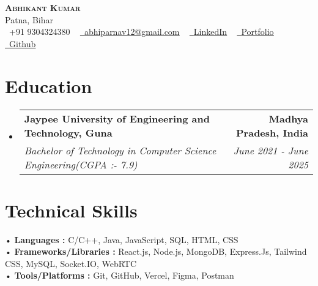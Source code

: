 \documentclass[letterpaper,11pt]{article}
\makeatletter
\newcommand{\resumeSubheading}[4]{
  \vspace{-2pt}\item
	\begin{tabular*}{1.0\textwidth}[t]{l@{\extracolsep{\fill}}r}
  	\textbf{#1} & \textbf{\small #2} \\
  	\textit{\small#3} & \textit{\small #4} \\
	\end{tabular*}\vspace{-7pt}
}
\newcommand{\resumeSubHeadingListStart}{\begin{itemize}[leftmargin=0.0in, label={}]}
\newcommand{\resumeSubHeadingListEnd}{\end{itemize}}
\makeatother
\begin{document}
 

\begin{center}
	{\Huge  {\scshape \textbf{Abhikant Kumar}}} \\ \vspace{3pt}
	Patna, Bihar  \\ \vspace{3pt}
	\small \raisebox{-0.1\height}\faPhone\ +91 9304324380 ~ \href{mailto:x@gmail.com}{\raisebox{-0.2\height}\faEnvelope\  \underline{abhiparnav12@gmail.com}} ~
	\href{https://linkedin.com/in//}{\raisebox{-0.2\height}\faLinkedin\ \underline{LinkedIn}} ~
   \href{https://abhikant-portfolio.netlify.app/}{\raisebox{-0.2\height}\faGlobe\ \underline{Portfolio}} ~ \href{https://github.com/abhikant12}{\raisebox{-0.2\height}\faGithub\ \underline{Github}}
\end{center}


\section{Education}
\begin{itemize}[leftmargin=0.12in, label={}]
  \vspace{-6pt}
  \resumeSubHeadingListStart
	\resumeSubheading
  	{Jaypee University of Engineering and Technology, Guna}{Madhya Pradesh, India}
  	{Bachelor of Technology in Computer Science Engineering(CGPA  :-  7.9)}{June 2021 - June 2025}
   \vspace{1pt}
  \resumeSubHeadingListEnd
\end{itemize} 



\section{Technical Skills }
 \begin{itemize}[leftmargin=0.12in, label={}]
        \vspace{2pt}
	\small{\item{
 	\hspace{-5pt}• \textbf{Languages : }{ C/C++, Java, JavaScript, SQL, HTML, CSS } \\  \vspace{5pt}
        \hspace{-5pt}• \textbf{Frameworks/Libraries :}  {React.js, Node.js, MongoDB, Express.Js, Tailwind CSS,  MySQL, Socket.IO, WebRTC   } \\  \vspace{5pt}
        \hspace{-5pt}• \textbf{Tools/Platforms :}  {Git, GitHub, Vercel, Figma, Postman} \\
	}}
 \end{itemize}
 \vspace{-10pt}
\end{document}
